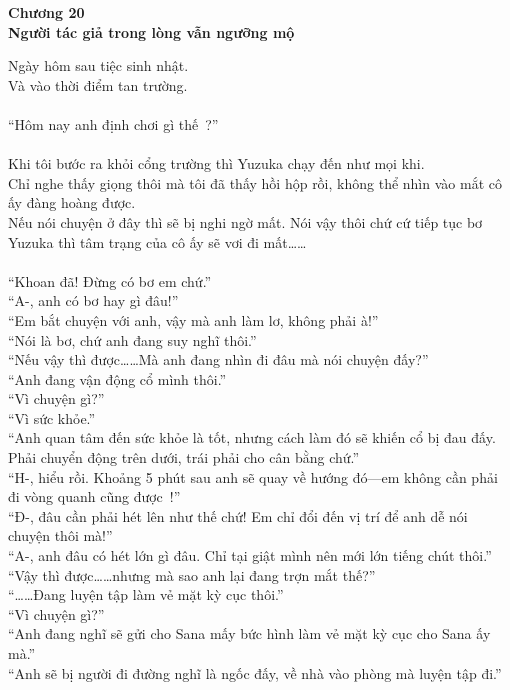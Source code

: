 \documentclass[12pt,a4paper, twosides]{book}
\begin{document}
    \begin{center}
    \textbf{\large Chương 20 \\ Người tác giả trong lòng vẫn ngưỡng mộ}
    \end{center}
    \noindent
Ngày hôm sau tiệc sinh nhật.\\
Và vào thời điểm tan trường.\\
\\
“Hôm nay anh định chơi gì thế~?”\\
\\
Khi tôi bước ra khỏi cổng trường thì Yuzuka chạy đến như mọi khi.\\
Chỉ nghe thấy giọng thôi mà tôi đã thấy hồi hộp rồi, không thể nhìn vào mắt cô ấy đàng hoàng được.\\
Nếu nói chuyện ở đây thì sẽ bị nghi ngờ mất. Nói vậy thôi chứ cứ tiếp tục bơ Yuzuka thì tâm trạng của cô ấy sẽ vơi đi mất……\\
\\
“Khoan đã! Đừng có bơ em chứ.”\\
“A-, anh có bơ hay gì đâu!”\\
“Em bắt chuyện với anh, vậy mà anh làm lơ, không phải à!”\\
“Nói là bơ, chứ anh đang suy nghĩ thôi.”\\
“Nếu vậy thì được……Mà anh đang nhìn đi đâu mà nói chuyện đấy?”\\
“Anh đang vận động cổ mình thôi.”\\
“Vì chuyện gì?”\\
“Vì sức khỏe.”\\
“Anh quan tâm đến sức khỏe là tốt, nhưng cách làm đó sẽ khiến cổ bị đau đấy. Phải chuyển động trên dưới, trái phải cho cân bằng chứ.”\\
“H-, hiểu rồi. Khoảng 5 phút sau anh sẽ quay về hướng đó—em không cần phải đi vòng quanh cũng được~!”\\
“Đ-, đâu cần phải hét lên như thế chứ! Em chỉ đổi đến vị trí để anh dễ nói chuyện thôi mà!”\\
“A-, anh đâu có hét lớn gì đâu. Chỉ tại giật mình nên mới lớn tiếng chút thôi.”\\
“Vậy thì được……nhưng mà sao anh lại đang trợn mắt thế?”\\
“……Đang luyện tập làm vẻ mặt kỳ cục thôi.”\\
“Vì chuyện gì?”\\
“Anh đang nghĩ sẽ gửi cho Sana mấy bức hình làm vẻ mặt kỳ cục cho Sana ấy mà.”\\
“Anh sẽ bị người đi đường nghĩ là ngốc đấy, về nhà vào phòng mà luyện tập đi.”\\
\end{document}
